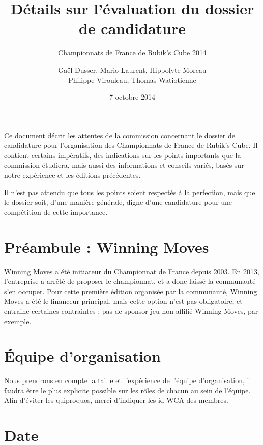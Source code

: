 \documentclass[a4paper,12pt]{scrartcl}
\title{\vfill Détails sur l'évaluation du dossier de candidature}
\subtitle{Championnats de France de Rubik's Cube 2014}
\author{Gaël Dusser, Mario Laurent, Hippolyte Moreau\\Philippe Virouleau, Thomas Watiotienne}
\date{7 octobre 2014\vfill}
\begin{document}




\maketitle



\pagebreak



Ce document décrit les attentes de la commission concernant le dossier de candidature pour l’organisation des Championnats de France de Rubik’s Cube. Il contient certains impératifs, des indications sur les points importants que la commission étudiera, mais aussi des informations et conseils variés, basés sur notre expérience et les éditions précédentes.

Il n’est pas attendu que tous les points soient respectés à la perfection, mais que le dossier soit, d’une manière générale, digne d’une candidature pour une compétition de cette importance.




\section*{Préambule : Winning Moves}

Winning Moves a été initiateur du Championnat de France depuis 2003. En 2013, l’entreprise a arrêté de proposer le championnat, et a donc laissé la communauté s’en occuper. 
Pour cette première édition organisée par la communauté, Winning Moves a été le financeur principal, mais cette option n’est pas obligatoire, et entraine certaines contraintes : pas de sponsor jeu non-affilié Winning Moves, par exemple.




\section*{Équipe d’organisation}


Nous prendrons en compte la taille et l’expérience de l’équipe d’organisation, il faudra être le plus explicite possible sur les rôles de chacun au sein de l’équipe. Afin d’éviter les quiproquos, merci d’indiquer les id WCA des membres.




\section*{Date}
\end{document}
